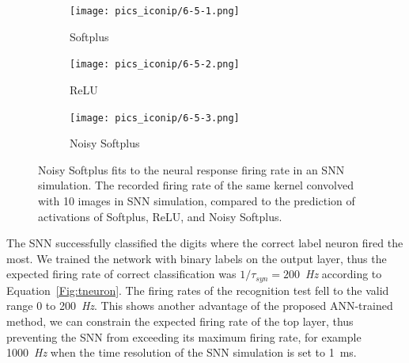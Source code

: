 \documentclass{article}
\begin{document}
\begin{figure}[hb!]
	\centering
	\begin{subfigure}[hb]{0.32\textwidth}
		\texttt{[image: pics\_iconip/6-5-1.png]}
		\caption{Softplus}
	\end{subfigure}
	\begin{subfigure}[hb]{0.32\textwidth}
		\texttt{[image: pics\_iconip/6-5-2.png]}
		\caption{ReLU}
	\end{subfigure}
	\begin{subfigure}[hb]{0.32\textwidth}
		\texttt{[image: pics\_iconip/6-5-3.png]}
		\caption{Noisy Softplus}
	\end{subfigure}
		\caption{Noisy Softplus fits to the neural response firing rate in an SNN simulation.
			The recorded firing rate of the same kernel convolved with 10 images in SNN simulation, compared to the prediction of activations of Softplus, ReLU, and Noisy Softplus.}
		\label{fig:af_compare}
\end{figure}		

The SNN successfully classified the digits where the correct label neuron fired the most.
We trained the network with binary labels on the output layer, thus the expected firing rate of correct classification was $1/\tau_{syn}=200$~\textit{Hz} according to Equation~\ref{Fig:tneuron}.
The firing rates of the recognition test fell to the valid range 0 to 200~\textit{Hz}.
This shows another advantage of the proposed ANN-trained method, we can constrain the expected firing rate of the top layer, thus preventing the SNN from exceeding its maximum firing rate, for example 1000~\textit{Hz} when the time resolution of the SNN simulation is set to 1~ms.
\end{document}
